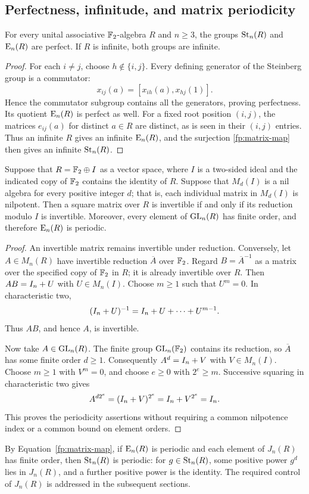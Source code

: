 \subsection{Perfectness, infinitude, and matrix periodicity}

\begin{lemma}
\label{fp:perfectness}
For every unital associative $\mathbb F_2$-algebra $R$ and $n\geq3$, the
groups $\operatorname{St}_n(R)$ and $\operatorname{E}_n(R)$ are perfect.  If $R$ is infinite,
both groups are infinite.
\end{lemma}

\begin{proof}
For each $i\neq j$, choose $h\notin\{i,j\}$.  Every defining
generator of the Steinberg group is a commutator:
\[
 x_{ij}(a)=[x_{ih}(a),x_{hj}(1)].
\]
Hence the commutator subgroup contains all the generators, proving
perfectness.  Its quotient $\operatorname{E}_n(R)$ is perfect as well.  For a fixed
root position $(i,j)$, the matrices $e_{ij}(a)$ for distinct $a\in R$
are distinct, as is seen in their $(i,j)$ entries.  Thus an infinite
$R$ gives an infinite $\operatorname{E}_n(R)$, and the surjection
\eqref{fp:matrix-map} then gives an infinite $\operatorname{St}_n(R)$.
\end{proof}

\begin{lemma}
\label{fp:matrix-periodicity}
Suppose that $R=\mathbb F_2\oplus I$ as a vector space, where $I$ is a
two-sided ideal and the indicated copy of $\mathbb F_2$ contains the identity
of $R$.  Suppose that $M_d(I)$ is a nil algebra for every positive
integer $d$; that is, each individual matrix in $M_d(I)$ is nilpotent.
Then a square matrix over $R$ is invertible if and only if its reduction
modulo $I$ is invertible.  Moreover, every element of $\operatorname{GL}_n(R)$ has
finite order, and therefore $\operatorname{E}_n(R)$ is periodic.
\end{lemma}

\begin{proof}
An invertible matrix remains invertible under reduction.  Conversely,
let $A\in M_n(R)$ have invertible reduction $\overline A$ over
$\mathbb F_2$.  Regard $B=\overline A^{-1}$ as a matrix over the specified
copy of $\mathbb F_2$ in $R$; it is already invertible over $R$.  Then
$AB=I_n+U$ with $U\in M_n(I)$.  Choose $m\geq1$ such that
$U^m=0$.  In characteristic two,
\[
 (I_n+U)^{-1}=I_n+U+\cdots+U^{m-1}.
\]
Thus $AB$, and hence $A$, is invertible.

Now take $A\in\operatorname{GL}_n(R)$.  The finite group $\operatorname{GL}_n(\mathbb F_2)$ contains
its reduction, so $\overline A$ has some finite order $d\geq1$.
Consequently $A^d=I_n+V$ with $V\in M_n(I)$.  Choose $m\geq1$
with $V^m=0$, and choose $e\geq0$ with $2^e\geq m$.
Successive squaring in characteristic two gives
\[
 A^{d2^e}=(I_n+V)^{2^e}=I_n+V^{2^e}=I_n.
\]
This proves the periodicity assertions without requiring a common
nilpotence index or a common bound on element orders.
\end{proof}

By Equation~\eqref{fp:matrix-map}, if $\operatorname{E}_n(R)$ is periodic and each
element of $J_n(R)$ has finite order, then $\operatorname{St}_n(R)$ is periodic:
for $g\in\operatorname{St}_n(R)$, some positive power $g^d$ lies in $J_n(R)$,
and a further positive power is the identity.  The required control of
$J_n(R)$ is addressed in the subsequent sections.
